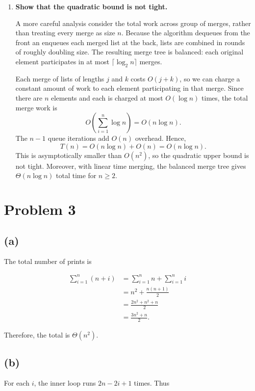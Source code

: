 \documentclass[11pt]{article}
\begin{document}
\begin{enumerate}[label=\textbf{(\alph*)},leftmargin=*]
\[
T(n) = O(n)\cdot O(n)=\boxed{O(n^2)}.
\]

\item \textbf{Show that the quadratic bound is not tight.}

A more careful analysis consider the total work across group of merges, rather than treating every merge as size $n$. Because the algorithm dequeues from the front an enqueues each merged list at the back, lists are combined in rounds of roughly doubling size. The resulting merge tree is balanced: each original element participates in at most $\lceil\log_2 n\rceil$ merges.

Each merge of lists of lengths $j$ and $k$ costs $O(j+k)$, so we can charge a constant amount of work to each element participating in that merge. Since there are $n$ elements and each is charged at most $O(\log n)$ times, the total merge work is 
\[
O\!\left(\sum_{i=1}^{n}\log n\right)=O(n\log n).
\]
The $n-1$ queue iterations add $O(n)$ overhead. Hence,
\[
T(n)=O(n\log n)+O(n)=\boxed{O(n\log n)}.
\]
This is asymptotically smaller than $O(n^2)$, so the quadratic upper bound is not tight. Moreover, with linear time merging, the balanced merge tree gives $\Theta(n\log n)$ total time for $n\geq 2$.
\end {enumerate}

\section*{Problem 3}

\subsection*{(a)}

The total number of prints is


\begin{align*}
\sum_{i=1}^{n}(n+i)
&=\sum_{i=1}^{n}n+\sum_{i=1}^{n}i\\
&=n^2+\frac{n(n+1)}{2}\\
&=\frac{2n^2+n^2+n}{2}\\
&=\boxed{\frac{3n^2+n}{2}}.
\end{align*}

Therefore, the total is $\Theta(n^2)$.


\subsection*{(b)}

For each $i$, the inner loop runs $2n-2i+1$ times. Thus
\end{document}
